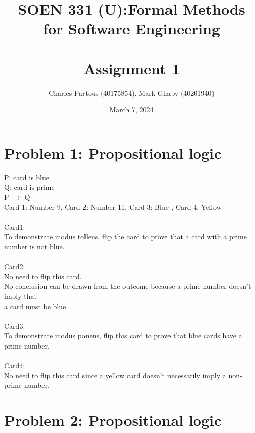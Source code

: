 \documentclass[12pt]{article}
\title{SOEN 331 (U):Formal Methods\\for Software Engineering\\
\ \\
Assignment 1}
\author{Charles Partous (40175854), Mark Ghaby (40201940)}
\date{March 7, 2024}
\begin{document}
\maketitle



\newpage
\section*{Problem 1: Propositional logic}

\begin{tabbing}
P: card is blue \\
Q: card is prime \\
P $\rightarrow$ Q \\

Card 1: Number 9, Card 2: Number 11, Card 3: Blue , Card 4: Yellow\\\\

Card1:\\ To demonstrate modus tollens, flip the card to  prove that a card with a prime number is not blue.\\\\

Card2: \\No need to flip this card. \\No conclusion can be drawn from the outcome because a prime number doesn’t imply that\\ a card must be blue.\\\\

Card3: \\To demonstrate modus ponens, flip this card to prove that blue cards have a prime number.\\\\

Card4: \\No need to flip this card since a yellow card doesn’t necessarily imply a non-prime number.
\end{tabbing}

\newpage
\section*{Problem 2: Propositional logic}
\end{document}
